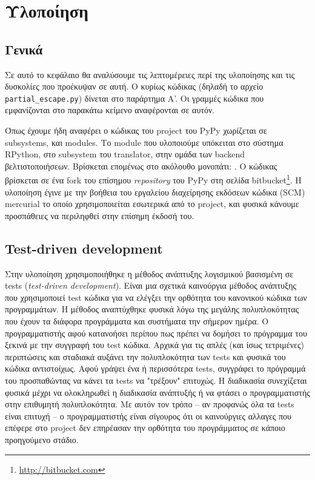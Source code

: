 
\chapter{Υλοποίηση}
\label{chapter4}

\section{Γενικά}


Σε αυτό το κεφάλαιο θα αναλύσουμε τις λεπτομέρειες περί της υλοποίησης και τις
δυσκολίες που προέκυψαν σε αυτή. Ο κυρίως κώδικας (δηλαδή το αρχείο
\texttt{partial\_escape.py}) δίνεται στο παράρτημα Α'. Οι γραμμές κώδικα που
εμφανίζονται στο παρακάτω κείμενο αναφέρονται σε αυτόν.


Όπως έχουμε ήδη αναφέρει ο κώδικας του project του PyPy χωρίζεται σε subsystems,
και modules. Το module που υλοποιούμε υπόκειται στο σύστημα RPython, στο
subsystem του translator, στην ομάδα των backend βελτιστοποιήσεων. Βρίσκεται
επομένως στο ακόλουθο μονοπάτι:
. Ο κώδικας
βρίσκεται σε ένα fork\cite{fork} του επίσημου \textit{repository} του
PyPy\cite{repo} στη σελίδα bitbucket\footnote{\url{http://bitbucket.com}}. Η
υλοποίηση έγινε με την βοήθεια του εργαλείου διαχείρησης εκδόσεων κώδικα (SCM)
mercurial\cite{mercurial} το οποίο χρησιμοποιείται εσωτερικά από το project, και
φυσικά κάνουμε προσπάθειες να περιληφθεί στην επίσημη έκδοσή του.


\section{Test-driven development}

Στην υλοποίηση χρησιμοποιήθηκε η μέθοδος ανάπτυξης λογισμικού βασισμένη σε tests
(\textit{test-driven development}\cite{tdd}). Είναι μια σχετικά καινούργια
μέθοδος ανάπτυξης που χρησιμοποιεί test κώδικα για να ελέγξει την ορθότητα του
κανονικού κώδικα των προγραμμάτων. Η μέθοδος αναπτύχθηκε φυσικά λόγω της μεγάλης
πολυπλοκότητας που έχουν τα διάφορα προγράμματα και συστήματα την σήμερον ημέρα.
Ο προγραμματιστής αφού κατανοήσει περίπου πως πρέπει να δομήσει το πρόγραμμα του
ξεκινά με την συγγραφή του test κώδικα. Αρχικά για τις απλές (και ίσως
τετριμένες) περιπτώσεις και σταδιακά αυξάνει την πολυπλοκότητα των tests και
φυσικά του κώδικα αντιστοίχως. Αφού γράψει ένα ή περισσότερα tests, συγγράφει το
πρόγραμμά του προσπαθώντας να κάνει τα tests να "τρέξουν" επιτυχώς. Η διαδικασία
συνεχίζεται φυσικά μέχρι να ολοκληρωθεί η διαδικασία ανάπτυξής ή να φτάσει ο
προγραμματιστής στην επιθυμητή πολυπλοκότητα. Με αυτόν τον τρόπο – αν προφανώς
όλα τα tests είναι επιτυχή – ο προγραμματιστής είναι σίγουρος ότι οι καινούργιες
αλλαγες που επέφερε στο project δεν επηρέασαν την ορθότητα του προγράμματος σε
κάποιο προηγούμενο στάδιο.

